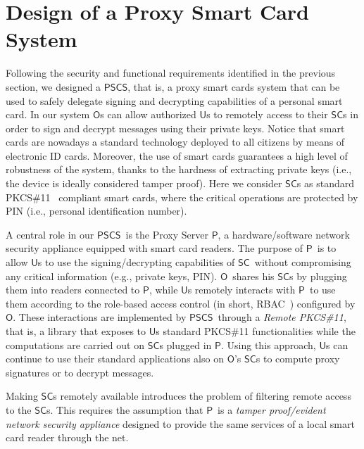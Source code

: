 \documentclass[runningheads]{llncs}
\newcommand{\Owner}{\ensuremath{\mathsf{O}}}
\newcommand{\User}{\ensuremath{\mathsf{U}}}
\newcommand{\Proxy}{\ensuremath{\mathsf{P}}}
\newcommand{\SC}{\ensuremath{\mathsf{SC}}}
\newcommand{\PSCS}{\ensuremath{\mathsf{PSCS}}}
\begin{document}
\section{Design of a Proxy Smart Card System}
\label{pcsc}
Following the security and functional requirements identified in the previous section, we designed a \PSCS , that is, a proxy smart cards system that can be used to safely delegate signing and decrypting capabilities of a personal smart card. In our system \Owner s can allow authorized \User s to remotely access to their \SC s in order to sign and decrypt messages using their private keys. Notice that smart cards are nowadays a standard technology deployed to all citizens by means of electronic ID cards. Moreover, the use of smart cards guarantees a high level of robustness of the system, thanks to the hardness of extracting private keys (i.e., the device is ideally considered tamper proof). Here we consider \SC s as standard
PKCS\#11~\cite{PKCS11} compliant smart cards, where the critical operations are protected by PIN (i.e., personal identification number).

A central role in our \PSCS\ is the Proxy Server \Proxy, a hardware/software network security appliance equipped with smart card readers. The purpose of \Proxy\ is to allow \User s to use the signing/decrypting capabilities of \SC\ without compromising any critical information (e.g., private keys, PIN).  \Owner\ shares his \SC s by plugging them into readers connected to \Proxy, while \User s remotely interacts with \Proxy\ to use them according to the role-based access control (in short, RBAC~\cite{RBAC}) configured by \Owner . These interactions are implemented by \PSCS\ through a \emph{Remote PKCS\#11}, that is, a library that exposes to \User s standard PKCS\#11 functionalities while the computations are carried out on \SC s plugged in \Proxy . Using this approach, \User s can continue to use their standard applications also on \Owner 's \SC s to compute proxy signatures or to decrypt messages.

Making \SC s remotely available introduces the problem of filtering remote access to the \SC s. This requires the assumption that \Proxy\  is a {\sl tamper proof/evident network security appliance} designed to provide the same services of a local smart card reader through the net.
\end{document}
